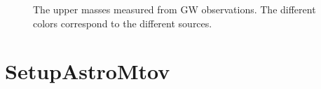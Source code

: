 \documentclass[letterpaper,10pt,english]{sphinxmanual}
\begin{document}
\begin{figure}[htbp]
\centering
\capstart

\noindent{}
\caption{The upper masses measured from GW observations. The different colors correspond to the different sources.}\label{\detokenize{source/api/setup_astro_mup:id1}}\end{figure}

\sphinxstepscope


\section{SetupAstroMtov}
\label{\detokenize{source/api/setup_astro_mtov:setupastromtov}}\label{\detokenize{source/api/setup_astro_mtov::doc}}\label{\detokenize{source/api/setup_astro_mtov:module-nucleardatapy.setup_astro_mtov}}
\end{document}
